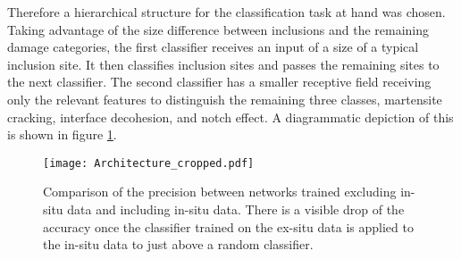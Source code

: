 Therefore a hierarchical structure for the classification task at hand was chosen. Taking advantage of the size difference between inclusions and the remaining damage categories, the first classifier receives an input of a size of a typical inclusion site. It then classifies inclusion sites and passes the remaining sites to the next classifier. The second classifier has a smaller receptive field receiving only the relevant features to distinguish the remaining three classes, martensite cracking, interface decohesion, and notch effect. A diagrammatic depiction of this is shown in figure \ref{fig:Architecture}.\\

%
%

\begin{figure}
\begin{center}
  \texttt{[image: Architecture\_cropped.pdf]}
\caption{Comparison of the precision between networks trained excluding in-situ data and including in-situ data. There is a visible drop of the accuracy once the classifier trained on the ex-situ data is applied to the in-situ data to just above a random classifier.}
\label{fig:Architecture}
\end{center}
\end{figure}

